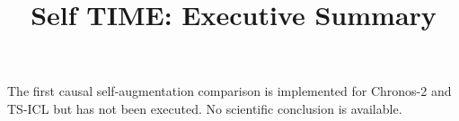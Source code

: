 \documentclass{article}
\title{Self TIME: Executive Summary}
\author{}
\date{}
\begin{document}
\maketitle
The first causal self-augmentation comparison is implemented for Chronos-2 and
TS-ICL but has not been executed. No scientific conclusion is available.
\end{document}
